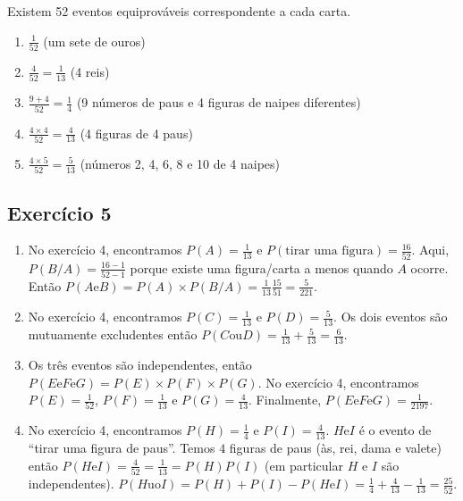 Existem 52 eventos equiprováveis correspondente a cada carta.

\begin{enumerate}
\item $\frac{1}{52}$ (um sete de ouros)
\item $\frac{4}{52} = \frac{1}{13}$ (4 reis)
\item $\frac{9 + 4}{52} = \frac{1}{4}$ (9 números de paus e 4 figuras de naipes
  diferentes)
\item $\frac{4 \times 4}{52} = \frac{4}{13}$ (4 figuras de 4 paus)
\item $\frac{4 \times 5}{52} = \frac{5}{13}$ (números 2, 4, 6, 8 e 10 de 4
  naipes)
\end{enumerate}

\subsection*{Exercício 5}

\begin{enumerate}

\item No exercício 4, encontramos $P(A) = \frac{1}{13}$
  e $P(\text{tirar uma figura}) = \frac{16}{52}$. Aqui,
  $P(B / A) = \frac{16 - 1}{52 - 1}$ porque existe uma figura/carta a menos
  quando $A$ ocorre. Então
  $P(A \text{e} B) = P(A) \times P(B / A) = 
  \frac{1}{13} \frac{15}{51} = \frac{5}{221}$.

\item No exercício 4, encontramos $P(C) = \frac{1}{13}$ e
  $P(D) = \frac{5}{13}$. Os dois eventos são mutuamente excludentes então
  $P(C \text{ou} D) = \frac{1}{13} + \frac{5}{13} = \frac{6}{13}$.

\item Os três eventos são independentes, então
  $P(E \text{e} F \text{e} G) = {P(E)} \times {P(F)} \times {P(G)}$.
  No exercício 4, encontramos
  $P(E) = \frac{1}{52}$, $P(F) = \frac{1}{13}$ e $P(G) = \frac{4}{13}$.
  Finalmente, $P(E \text{e} F \text{e} G) = \frac{1}{2197}$.

\item No exercício 4, encontramos
  $P(H) = \frac{1}{4}$ e $P(I) = \frac{4}{13}$.
  $H \text{e} I$ é o evento de ``tirar uma figura de paus''. Temos $4$ figuras
  de paus (às, rei, dama e valete) então
  $P(H \text{e} I) = \frac{4}{52}=\frac{1}{13} = P(H) P(I)$ (em particular
  $H$ e $I$ são independentes).
  $P(H \text{uo} I) = P(H) + P(I) - P(H \text{e} I) =
  \frac{1}{4} + \frac{4}{13} - \frac{1}{13} = \frac{25}{52}$.
\end{enumerate}

